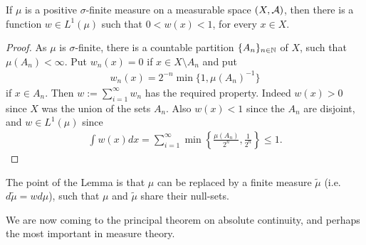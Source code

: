 \documentclass[../../main.tex]{subfiles}
\begin{document}
\begin{lemma}\label{lem: function w}
If $\mu$ is a positive $\sigma$-finite measure on a measurable space $(X, \mathcal{A})$, then there is a function $w\in L^{1}(\mu)$ such that $0<w(x)<1$, for every $x\in X$.
\end{lemma}
\begin{proof}
As $\mu$ is $\sigma$-finite, there is a countable partition $\{A_{n}\}_{n\in \mathbb{N}}$ of $X$, such that $\mu(A_{n})<\infty$. Put $w_{n}(x)=0$ if $x\in X\setminus A_{n}$ and put
\begin{align*}
	w_{n}(x)=2^{-n}\min\{1, \mu(A_{n})^{-1}\}
\end{align*}
if $x\in A_{n}$. Then $w:=\sum_{i=1}^{\infty}w_{n}$ has the required property. Indeed $w(x)>0$ since $X$ was the union of the sets $A_{n}$. Also $w(x)<1$ since the $A_{n}$ are disjoint, and $w\in L^{1}(\mu)$ since
\begin{align*}
	\int w(x)dx = \sum_{i=1}^{\infty} \min\left\{\frac{\mu(A_{n})}{2^{n}}, \frac{1}{2^{n}}\right\} \le 1.
\end{align*}
\end{proof}

The point of the Lemma is that $\mu$ can be replaced by a finite measure $\tilde{\mu}$ (i.e. $d\tilde{\mu}=wd\mu$), such that $\mu$ and $\tilde{\mu}$ share their null-sets.

We are now coming to the principal theorem on absolute continuity, and perhaps the most important in measure theory.
\end{document}
